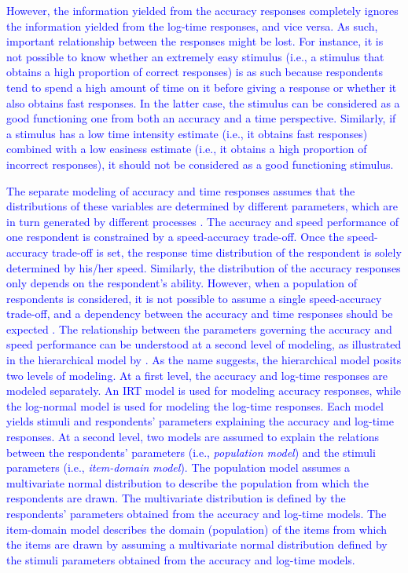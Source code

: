 \documentclass[12pt]{book}
\begin{document}
\textcolor{blue}{However, the information yielded from the accuracy responses completely ignores the information yielded from the log-time responses, and vice versa. As such, important relationship between the responses might be lost. 
	For instance, it is not possible to know whether an extremely easy stimulus (i.e., a stimulus that obtains a high proportion of correct responses) is as such because respondents tend to spend a high amount of time on it before giving a response or whether it also obtains fast responses. 
	In the latter case, the stimulus can be considered as a good functioning one from both an accuracy and a time perspective. 
	Similarly, if a stimulus has a low time intensity estimate (i.e., it obtains fast responses) combined with a low easiness estimate (i.e., it obtains a high proportion of incorrect responses), it should not be considered as a good functioning stimulus.  
}


\textcolor{blue}{The separate modeling of accuracy and time responses assumes that the distributions of these variables are determined by different parameters, which are in turn generated by different processes \cite{van2006}.   
	The accuracy and speed performance of one respondent is constrained by a speed-accuracy trade-off. 
	Once the speed-accuracy trade-off is set, the response time distribution of the respondent is solely determined by his/her speed. 
	Similarly, the distribution of the accuracy responses only depends on the respondent's ability.
	However, when a population of respondents is considered, it is not possible to assume a single speed-accuracy trade-off, and a dependency between the accuracy and time responses should be expected \cite{van2006, VanDerLinden2007}.
	The relationship between the parameters governing the accuracy and speed performance can be understood at a second level of modeling, as illustrated in the hierarchical model by .
	As the name suggests, the hierarchical model posits two levels of modeling. 
	At a first level, the accuracy and log-time responses are modeled separately. An IRT model is used for modeling accuracy responses, while the log-normal model is used for modeling the log-time responses. 
	Each model yields stimuli and respondents' parameters explaining the accuracy and log-time responses.
	At a second level, two models are assumed to explain the relations between the respondents' parameters (i.e., \emph{population model}) and the stimuli parameters (i.e., \emph{item-domain model}).   
	The population model assumes a multivariate normal distribution to describe the population from which the respondents are drawn. 
	The multivariate distribution is defined by the respondents' parameters obtained from the accuracy and log-time models.
	The item-domain model describes the domain (population) of the items from which the items are drawn by assuming a multivariate normal distribution defined by the stimuli parameters obtained from the accuracy and log-time models. 
}
\end{document}
